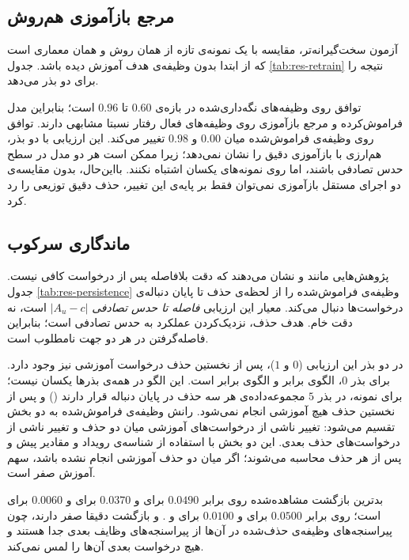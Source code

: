 \subsection{مرجع بازآموزی هم‌روش}
\label{subsec:res-retrain}

آزمون سخت‌گیرانه‌تر، مقایسه با یک نمونه‌ی تازه از همان روش و همان معماری است که از ابتدا بدون وظیفه‌ی هدف آموزش دیده باشد. جدول \ref{tab:res-retrain} نتیجه را برای دو بذر می‌دهد.



توافق روی وظیفه‌های نگه‌داری‌شده در بازه‌ی $0.60$ تا $0.96$ است؛ بنابراین مدل فراموش‌کرده و مرجع بازآموزی روی وظیفه‌های فعال رفتار نسبتا مشابهی دارند. توافق روی وظیفه‌ی فراموش‌شده میان $0.00$ و $0.98$ تغییر می‌کند. این ارزیابی با دو بذر، هم‌ارزی با بازآموزی دقیق را نشان نمی‌دهد؛ زیرا ممکن است هر دو مدل در سطح حدس تصادفی باشند، اما روی نمونه‌های یکسان اشتباه نکنند. بااین‌حال، بدون مقایسه‌ی دو اجرای مستقل بازآموزی نمی‌توان فقط بر پایه‌ی این تغییر، حذف دقیق توزیعی را رد کرد.

\subsection{ماندگاری سرکوب}
\label{subsec:res-persistence}

پژوهش‌هایی مانند  \cite{adhikari2026uncle} و  \cite{lin2026cata} نشان می‌دهند که دقت بلافاصله پس از درخواست کافی نیست. جدول \ref{tab:res-persistence} وظیفه‌ی فراموش‌شده را از لحظه‌ی حذف تا پایان دنباله‌ی درخواست‌ها دنبال می‌کند. معیار این ارزیابی \emph{فاصله تا حدس تصادفی} $|A_u-c|$ است، نه دقت خام. هدف حذف، نزدیک‌کردن عملکرد به حدس تصادفی است؛ بنابراین فاصله‌گرفتن در هر دو جهت نامطلوب است.

در دو بذر این ارزیابی ($0$ و $1$)، پس از نخستین حذف درخواست آموزشی نیز وجود دارد. برای بذر $0$، الگوی  برابر  و الگوی  برابر  است. این الگو در همه‌ی بذرها یکسان نیست؛ برای نمونه، در بذر $5$ مجموعه‌داده‌ی  هر سه حذف در پایان دنباله قرار دارند () و پس از نخستین حذف هیچ آموزشی انجام نمی‌شود. رانش وظیفه‌ی فراموش‌شده به دو بخش تقسیم می‌شود: تغییر ناشی از درخواست‌های آموزشی میان دو حذف و تغییر ناشی از درخواست‌های حذف بعدی. این دو بخش با استفاده از شناسه‌ی رویداد و مقادیر پیش و پس از هر حذف محاسبه می‌شوند؛ اگر میان دو حذف آموزشی انجام نشده باشد، سهم آموزش صفر است.



بدترین بازگشت مشاهده‌شده روی  برابر $0.0490$ برای  و $0.0370$ برای  و $0.0060$ برای  است؛ روی  برابر $0.0500$ برای  و $0.0100$ برای  و .  و  بازگشت دقیقا صفر دارند، چون پیراسنجه‌های وظیفه‌ی حذف‌شده در آن‌ها از پیراسنجه‌های وظایف بعدی جدا هستند و هیچ درخواست بعدی آن‌ها را لمس نمی‌کند.

